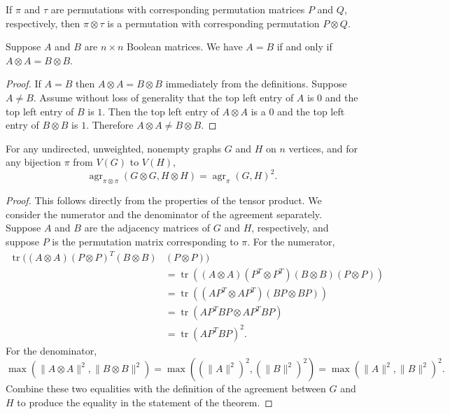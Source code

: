 \documentclass{article}
\newcommand{\1}{\mathbf{1}}
\DeclareMathOperator{\tr}{tr}
\DeclareMathOperator{\agr}{agr}
\begin{document}
\begin{theorem}
  If $\pi$ and $\tau$ are permutations with corresponding permutation matrices $P$ and $Q$, respectively, then $\pi \otimes \tau$ is a permutation with corresponding permutation $P \otimes Q$.
\end{theorem}

\begin{theorem}
  Suppose $A$ and $B$ are $n \times n$ Boolean matrices.
  We have $A = B$ if and only if $A \otimes A = B \otimes B$.
\end{theorem}
\begin{proof}
  If $A = B$ then $A \otimes A = B \otimes B$ immediately from the definitions.
  Suppose $A \neq B$.
  Assume without loss of generality that the top left entry of $A$ is $0$ and the top left entry of $B$ is $1$.
  Then the top left entry of $A \otimes A$ is a $0$ and the top left entry of $B \otimes B$ is $1$.
  Therefore $A \otimes A \neq B \otimes B$.
\end{proof}

\begin{theorem}
  For any undirected, unweighted, nonempty graphs $G$ and $H$ on $n$ vertices, and for any bijection $\pi$ from $V(G)$ to $V(H)$,
  \begin{equation*}
    \agr_{\pi \otimes \pi}(G \otimes G, H \otimes H) = \agr_\pi(G, H)^2.
  \end{equation*}
\end{theorem}
\begin{proof}
  This follows directly from the properties of the tensor product.
  We consider the numerator and the denominator of the agreement separately.
  Suppose $A$ and $B$ are the adjacency matrices of $G$ and $H$, respectively, and suppose $P$ is the permutation matrix corresponding to $\pi$.
  For the numerator,
  \begin{align*}
    \tr((A \otimes A)(P \otimes P)^T(B \otimes B) & (P \otimes P)) \\
    & = \tr((A \otimes A)(P^T \otimes P^T)(B \otimes B)(P \otimes P)) \\
    & = \tr((AP^T \otimes AP^T)(BP \otimes BP)) \\
    & = \tr(AP^TBP \otimes AP^TBP) \\
    & = \tr(AP^TBP)^2.
  \end{align*}
  For the denominator,
  \begin{equation*}
    \max(\|A \otimes A\|^2, \|B \otimes B\|^2) = \max((\|A\|^2)^2, (\|B\|^2)^2) = \max(\|A\|^2, \|B\|^2)^2.
  \end{equation*}
  Combine these two equalities with the definition of the agreement between $G$ and $H$ to produce the equality in the statement of the theorem.
\end{proof}
\end{document}
